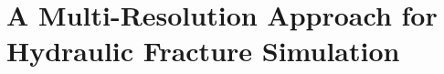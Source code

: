 \chapter{A Multi-Resolution Approach for Hydraulic Fracture Simulation}
\label{section: Chapter3}










